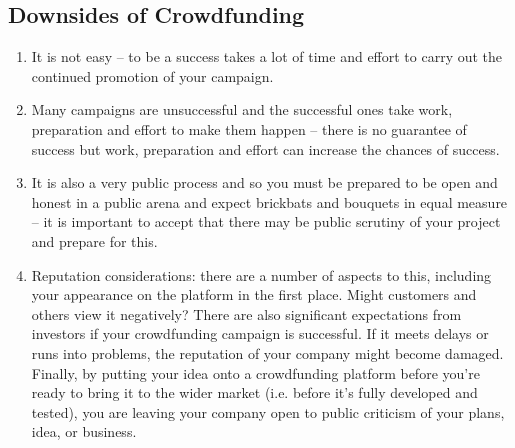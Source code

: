 \subsection*{ Downsides of Crowdfunding}
\begin{enumerate}
      \item It is not easy – to be a success takes a lot of time and effort to carry out the continued promotion of your campaign.
      \item Many campaigns are unsuccessful and the successful ones take work, preparation and effort to make them happen – there is no guarantee of success but work, preparation and effort can increase the chances of success.
      \item It is also a very public process and so you must be prepared to be open and honest in a public arena and expect brickbats and bouquets in equal measure – it is important to accept that there may be public scrutiny of your project and prepare for this.
      \item Reputation considerations: there are a number of aspects to this, including your appearance on the platform in the first place. Might customers and others view it negatively? There are also significant expectations from investors if your crowdfunding campaign is successful. If it meets delays or runs into problems, the reputation of your company might become damaged. Finally, by putting your idea onto a crowdfunding platform before you’re ready to bring it to the wider market (i.e. before it’s fully developed and tested), you are leaving your company open to public criticism of your plans, idea, or business.
\end{enumerate}


